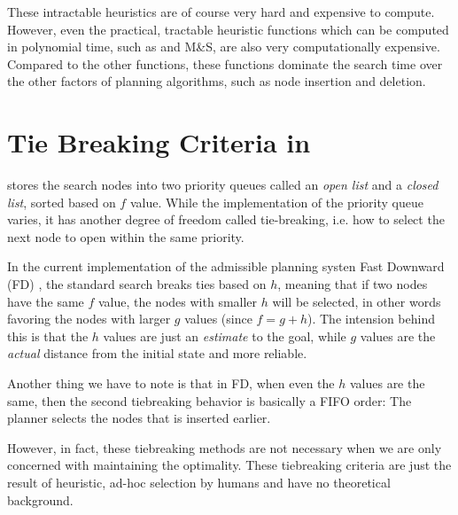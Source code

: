 These intractable heuristics are of course very hard and expensive to compute. However, even the practical, tractable heuristic functions which can be computed in polynomial time, such as \lmcut and M\&S, are also very computationally expensive. Compared to the other functions, these functions dominate the search time over the other factors of planning algorithms, such as node insertion and deletion.

\section{Tie Breaking Criteria in \astar}


\astar stores the search nodes into two priority queues called an \emph{open list} and a \emph{closed list}, sorted based on $f$ value. While the implementation of the priority queue varies, it has another degree of freedom called tie-breaking, i.e. how to select the next node to open within the same priority.

In the current implementation of the \sota admissible planning systen Fast Downward (FD) \cite{Helmert2006}, the standard \astar search breaks ties based on $h$, meaning that if two nodes have the same $f$ value, the nodes with smaller $h$ will be selected, in other words favoring the nodes with larger $g$ values (since $f=g+h$). The intension behind this is that the $h$ values are just an \emph{estimate} to the goal, while $g$ values are the \emph{actual} distance from the initial state and more reliable.

Another thing we have to note is that in FD, when even the $h$ values are the same, then the second tiebreaking behavior is basically a FIFO order: The planner selects the nodes that is inserted earlier.  

However, in fact, these tiebreaking methods are not necessary when we are only concerned with  maintaining the optimality. These tiebreaking criteria are just the result of heuristic, ad-hoc selection by humans and have no theoretical background.

